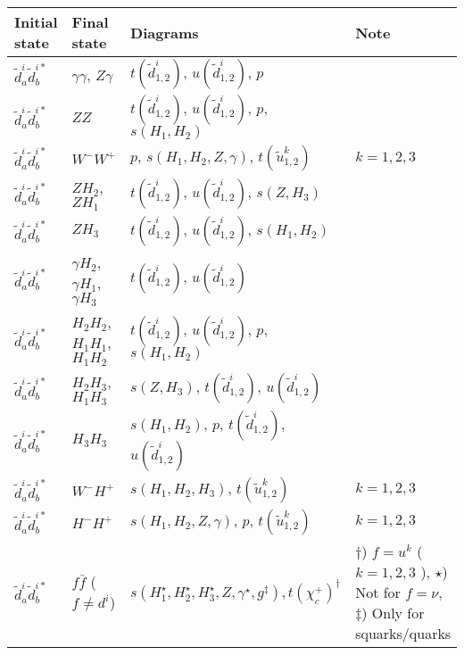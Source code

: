 {\small
\begin{center}
\begin{tabular}{llll} \hline
{\bfseries Initial state} & {\bfseries Final state} &
{\bfseries Diagrams} & {\bfseries Note} \\ \hline \tabspace
$\tilde{d}^i_a \tilde{d}^{i*}_{b}$ & $\gamma \gamma$, $Z \gamma$ &
$t(\tilde{d}^i_{1,2})$, $u(\tilde{d}^i_{1,2})$, $p$ \\
$\tilde{d}^i_a\tilde{d}^{i*}_b$ & $Z Z$ &
$t(\tilde{d}^i_{1,2})$, $u(\tilde{d}^i_{1,2})$, $p$, $s(H_{1},H_{2})$ \\
$\tilde{d}^i_a\tilde{d}^{i*}_b$ & $W^-W^+$ &
$p$, $s(H_{1},H_{2},Z,\gamma)$, $t(\tilde{u}^k_{1,2})$ 
& $k=1,2,3$\\
$\tilde{d}^i_a\tilde{d}^{i*}_b$ & $Z H_{2}$, $Z H_{1}$ &
$t(\tilde{d}^i_{1,2})$, $u(\tilde{d}^i_{1,2})$, $s(Z,H_3)$ \\
$\tilde{d}^i_a\tilde{d}^{i*}_b$ & $Z H_{3}$ &
$t(\tilde{d}^i_{1,2})$, $u(\tilde{d}^i_{1,2})$, $s(H_{1},H_{2})$ \\
$\tilde{d}^i_a\tilde{d}^{i*}_b$ & $\gamma H_{2}$, $\gamma H_{1}$, $\gamma H_{3}$ &
$t(\tilde{d}^i_{1,2})$, $u(\tilde{d}^i_{1,2})$  \\
$\tilde{d}^i_a\tilde{d}^{i*}_b$ & $H_{2} H_{2}$, $H_{1} H_{1}$, 
$H_{1} H_{2}$ &
$t(\tilde{d}^i_{1,2})$, $u(\tilde{d}^i_{1,2})$, $p$, $s(H_{1},H_{2})$ \\
$\tilde{d}^i_a \tilde{d}^{i*}_b$ & $H_{2} H_{3}$, $H_{1} H_{3}$ &
$s(Z,H_3)$, $t(\tilde{d}^i_{1,2})$, $u(\tilde{d}^i_{1,2})$ \\
$\tilde{d}^i_a\tilde{d}^{i*}_b$ & $H_{3} H_{3}$ &
$s(H_{1},H_{2})$, $p$, $t(\tilde{d}^i_{1,2})$, $u(\tilde{d}^i_{1,2})$ \\
$\tilde{d}^i_a\tilde{d}^{i*}_b$ & $W^- H^+$ &
$s(H_{1},H_{2},H_3)$, $t(\tilde{u}^k_{1,2})$ 
& $k=1,2,3$\\
$\tilde{d}^i_a\tilde{d}^{i*}_b$ & $H^- H^+$ &
$s(H_{1},H_{2},Z,\gamma)$, $p$, $t(\tilde{u}^k_{1,2})$ 
& $k=1,2,3$\\
$\tilde{d}^i_a\tilde{d}^{i*}_b$ & $f \bar{f}$ ($f \ne d^i$) &
$s(H_{1}^\star,H_{2}^\star,H_{3}^\star,Z,\gamma^\star,g^\ddagger), t(\chi_c^+)^\dagger$ 
& \parbox[t]{4cm}{$\dagger$) $f=u^k$ ($k=1,2,3$ ), $\star$) Not for $f=\nu$, 
$\ddagger$) Only for squarks/quarks} \\
$\tilde{d}^i_a\tilde{d}^{i*}_b$ & $d^i \bar{d}^i$ &

\end{tabular}
\end{center}}
